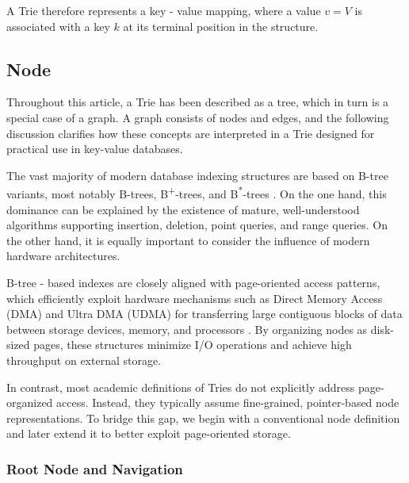 \documentclass[pdflatex,sn-mathphys-num]{sn-jnl}%
\theoremstyle{thmstyleone}%
\theoremstyle{thmstyletwo}%
\theoremstyle{thmstylethree}%
\begin{document}
A Trie therefore represents a key - value mapping, where a value
\(v = V\) is associated with a key $k$ at its terminal position in the
structure.

\subsection{Node}\label{node}

Throughout this article, a Trie has been described as a tree, which in
turn is a special case of a graph. A graph consists of nodes and edges,
and the following discussion clarifies how these concepts are
interpreted in a Trie designed for practical use in key-value
databases.

The vast majority of modern database indexing structures are based on
B-tree variants, most notably B-trees, B\textsuperscript{+}-trees, and B\textsuperscript{*}-trees \cite{zhang2022memory,idreos2019design}.
      On the one hand, this dominance can be explained by the existence
of mature, well-understood algorithms supporting insertion, deletion,
point queries, and range queries. On the other hand, it is equally
important to consider the influence of modern hardware architectures.

B-tree - based indexes are closely aligned with page-oriented access
patterns, which efficiently exploit hardware mechanisms such as Direct
Memory Access (DMA) and Ultra DMA (UDMA) for transferring large
contiguous blocks of data between storage devices, memory, and
processors \cite{fent2020low,vogel2023towards,lasch2024heterogeneous}. By organizing nodes as disk-sized pages, these
structures minimize I/O operations and achieve high throughput on
external storage.

In contrast, most academic definitions of Tries do not explicitly
address page-organized access. Instead, they typically assume
fine-grained, pointer-based node representations. To bridge this gap, we
begin with a conventional node definition and later extend it to better
exploit page-oriented storage.

\subsubsection{Root Node and Navigation}\label{root-node-and-navigation}
\end{document}

